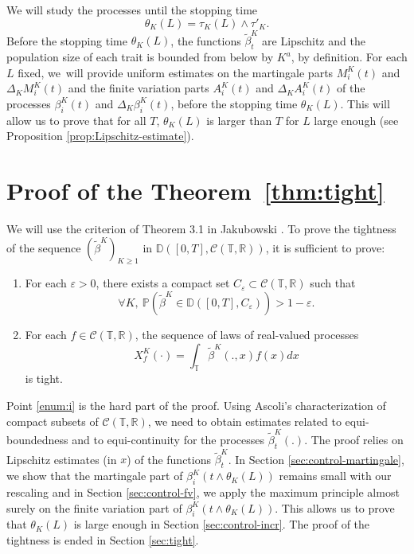 \documentclass[JEP,XML,SOM,Unicode,published]{cedram}
\newenvironment{enumeratei}
{\bgroup\def\theenumi{\roman{enumi}}\def\theenumii{\arabic{enumii}}\begin{enumerate}}
{\end{enumerate}\egroup}
\theoremstyle{plain}
\theoremstyle{remark}
\newcommand{\Co}{\mathcal{C}}
\newcommand\T{\mathbb{T}}
\begin{document}
We will study the processes until the stopping time
\begin{equation}
\theta_K(L)=\tau_K(L)\wedge \tau'_{K}.\label{def:thetaK(L)}
\end{equation}
Before the stopping time $\theta_K(L)$, the functions $\widetilde{\beta}^K_t$ are Lipschitz and the population size of each trait is bounded from below by $K^a$, by definition. For each $L$ fixed, we~will provide uniform estimates on the martingale parts $M^K_{i}(t)$ and $\Delta_K M^K_{i}(t)$ and the finite variation parts $A^K_{i}(t)$ and $\Delta_K A^K_{i}(t)$ of the processes $\beta^K_{i}(t)$ and $\Delta_K\beta^K_{i}(t)$, before the stopping time $\theta_K(L)$. This will allow us to prove that for all $T$, $\theta_K(L)$ is larger than $T$ for $L$ large enough (see Proposition \ref{prop:Lipschitz-estimate}).

\section{Proof of the Theorem~\ref{thm:tight}}
\label{sec:main-steps}

We will use the criterion of Theorem 3.1 in Jakubowski \cite{jakubowski}. To prove the tightness of the sequence $(\widetilde{\beta}^K)_{K\geq 1}$ in $\mathbb{D}([0,T],\Co(\T,\mathbb{R}))$, it is sufficient to prove:

\begin{enumeratei}
\item\label{enum:i}
For each $\varepsilon>0$, there exists a compact set $C_{\varepsilon}\subset \Co(\T,\mathbb{R})$ such that
\[\forall K,\ \mathbb{P}\left(\widetilde \beta^K\in \mathbb{D}([0,T], C_{\varepsilon})\right) >1-\varepsilon.\]
\item\label{enum:ii}
For each $f\in \Co(\T,\mathbb{R})$, the sequence of laws of real-valued processes
\begin{equation}\label{def-Xf}X^K_{f}(\cdot) = \int_\T \widetilde \beta^K(.,x) f(x) dx\end{equation}
is tight.
\end{enumeratei}

Point \eqref{enum:i} is the hard part of the proof. Using Ascoli's characterization of compact subsets of $\Co(\T,\mathbb{R})$, we need to obtain estimates related to equi-boundedness and to equi-continuity for the processes $\widetilde \beta^K_{t}(.)$.
The proof relies on Lipschitz estimates (in $x$) of the functions $\widetilde{\beta}^K_t$. In Section \ref{sec:control-martingale}, we show that the martingale part of $\beta^K_i(t\wedge\theta_K(L))$ remains small with our rescaling and in Section \ref{sec:control-fv}, we apply the maximum principle almost surely on the finite variation part of $\beta^K_i(t\wedge\theta_K(L))$. This allows us to prove that $\theta_K(L)$ is large enough in Section \ref{sec:control-incr}. The proof of the tightness is ended in Section \ref{sec:tight}.
\end{document}
